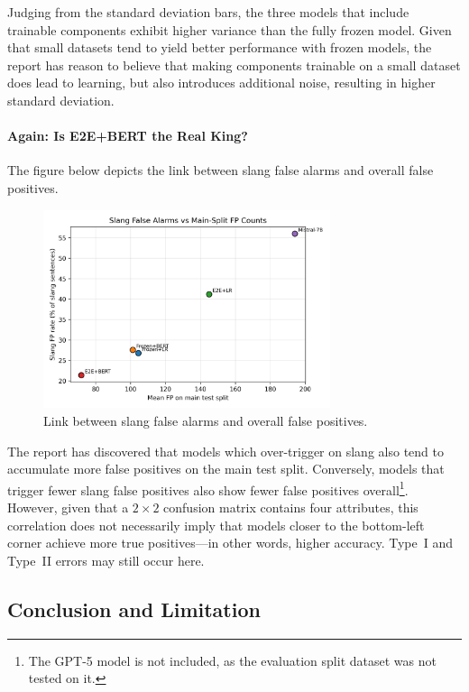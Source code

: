 \documentclass[12pt]{article}
\begin{document}
Judging from the standard deviation bars, the three models that include trainable components exhibit higher variance than the fully frozen model. 
Given that small datasets tend to yield better performance with frozen models, the report has reason to believe that making components trainable on a small dataset does lead to learning, but also introduces additional noise, resulting in higher standard deviation.

\paragraph{Again: Is E2E+BERT the Real King?}

The figure below depicts the link between slang false alarms and overall false positives.

\begin{figure}[H]
    \centering
    \includegraphics[width=0.75\textwidth]{figures/slang_fp_vs_main_fp.png}
    \caption{Link between slang false alarms and overall false positives.}
    \label{fig:slang-fp-correlation}
\end{figure}

The report has discovered that models which over-trigger on slang also tend to accumulate more false positives on the main test split. 
Conversely, models that trigger fewer slang false positives also show fewer false positives overall\footnote{The GPT-5 model is not included, as the evaluation split dataset was not tested on it.}. 
However, given that a $2 \times 2$ confusion matrix contains four attributes, this correlation does not necessarily imply that models closer to the bottom-left corner achieve more true positives\;---\;in other words, higher accuracy. 
Type~I and Type~II errors may still occur here.

\subsection{Conclusion and Limitation}
\end{document}
